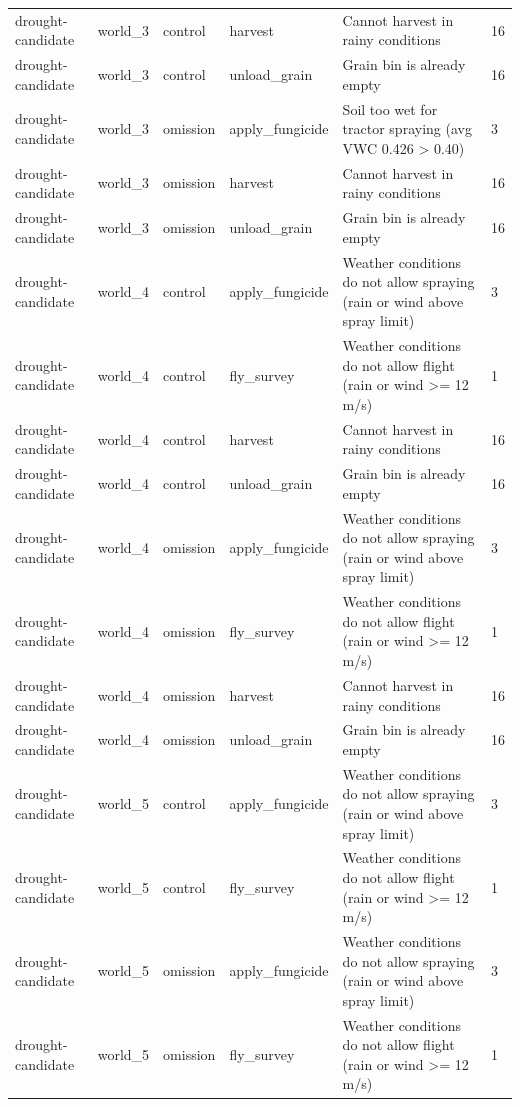 {\begin{tabular}{llllll}
drought-candidate & world\_3 & control & harvest & Cannot harvest in rainy conditions & 16 \\
drought-candidate & world\_3 & control & unload\_grain & Grain bin is already empty & 16 \\
drought-candidate & world\_3 & omission & apply\_fungicide & Soil too wet for tractor spraying (avg VWC 0.426 > 0.40) & 3 \\
drought-candidate & world\_3 & omission & harvest & Cannot harvest in rainy conditions & 16 \\
drought-candidate & world\_3 & omission & unload\_grain & Grain bin is already empty & 16 \\
drought-candidate & world\_4 & control & apply\_fungicide & Weather conditions do not allow spraying (rain or wind above spray limit) & 3 \\
drought-candidate & world\_4 & control & fly\_survey & Weather conditions do not allow flight (rain or wind >= 12 m/s) & 1 \\
drought-candidate & world\_4 & control & harvest & Cannot harvest in rainy conditions & 16 \\
drought-candidate & world\_4 & control & unload\_grain & Grain bin is already empty & 16 \\
drought-candidate & world\_4 & omission & apply\_fungicide & Weather conditions do not allow spraying (rain or wind above spray limit) & 3 \\
drought-candidate & world\_4 & omission & fly\_survey & Weather conditions do not allow flight (rain or wind >= 12 m/s) & 1 \\
drought-candidate & world\_4 & omission & harvest & Cannot harvest in rainy conditions & 16 \\
drought-candidate & world\_4 & omission & unload\_grain & Grain bin is already empty & 16 \\
drought-candidate & world\_5 & control & apply\_fungicide & Weather conditions do not allow spraying (rain or wind above spray limit) & 3 \\
drought-candidate & world\_5 & control & fly\_survey & Weather conditions do not allow flight (rain or wind >= 12 m/s) & 1 \\
drought-candidate & world\_5 & omission & apply\_fungicide & Weather conditions do not allow spraying (rain or wind above spray limit) & 3 \\
drought-candidate & world\_5 & omission & fly\_survey & Weather conditions do not allow flight (rain or wind >= 12 m/s) & 1 \\

\end{tabular}}
